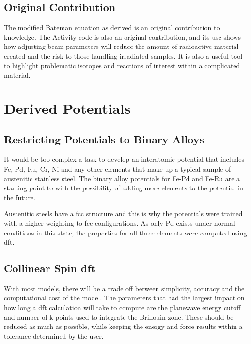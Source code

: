 \subsection{Original Contribution}

The modified Bateman equation as derived is an original contribution to knowledge.  The Activity code is also an original contribution, and its use shows how adjusting beam parameters will reduce the amount of radioactive material created and the risk to those handling irradiated samples.  It is also a useful tool to highlight problematic isotopes and reactions of interest within a complicated material.



\section{Derived Potentials}

\subsection{Restricting Potentials to Binary Alloys}

It would be too complex a task to develop an interatomic potential that includes Fe, Pd, Ru, Cr, Ni and any other elements that make up a typical sample of austenitic stainless steel.  The binary alloy potentials for Fe-Pd and Fe-Ru are a starting point to with the possibility of adding more elements to the potential in the future.

Austenitic steels have a \acrshort{fcc} structure and this is why the potentials were trained with a higher weighting to \acrshort{fcc} configurations.  As only Pd exists under normal conditions in this state, the properties for all three elements were computed using \acrshort{dft}.


\subsection{Collinear Spin \acrshort{dft}}

With most models, there will be a trade off between simplicity, accuracy and the computational cost of the model.  The parameters that had the largest impact on how long a \acrshort{dft} calculation will take to compute are the planewave energy cutoff and number of k-points used to integrate the Brillouin zone.  These should be reduced as much as possible, while keeping the energy and force results within a tolerance determined by the user.

